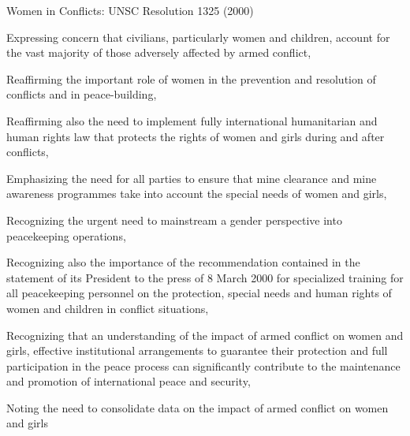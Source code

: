 \documentclass{beamer}
\begin{document}
\begin{frame}{Women in Conflicts: UNSC Resolution 1325 (2000)}
\begin{itemize}
    {\scriptsize
    \pause\item Expressing concern that civilians, particularly women and children, account for the vast majority of those adversely affected by armed conflict,
    \pause\item Reaffirming the important role of women in the prevention and resolution of conflicts and in peace-building,
    \pause\item Reaffirming also the need to implement fully international humanitarian and human rights law that protects the rights of women and girls during and after conflicts,
    \pause\item Emphasizing the need for all parties to ensure that mine clearance and mine awareness programmes take into account the special needs of women and girls,
    \pause\item Recognizing the urgent need to mainstream a gender perspective into peacekeeping operations,
    \pause\item Recognizing also the importance of the recommendation contained in the statement of its President to the press of 8 March 2000 for specialized training for all peacekeeping personnel on the protection, special needs and human rights of women and children in conflict situations,
    \pause\item Recognizing that an understanding of the impact of armed conflict on women and girls, effective institutional arrangements to guarantee their protection and full participation in the peace process can significantly contribute to the maintenance and promotion of international peace and security,
    \pause\item Noting the need to consolidate data on the impact of armed conflict on women and girls
    }
\end{itemize}
\end{frame}
\end{document}
